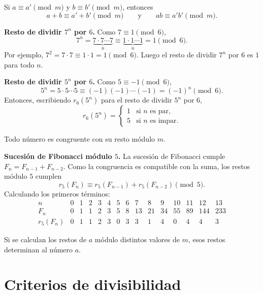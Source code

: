 \begin{proposicion}[{title={Lema: compatibilidad con las operaciones}}]
Si $a\equiv a' \pmod m$ y $b\equiv b' \pmod m$, entonces
\[
a+b \equiv a'+b' \pmod m \qquad \text{y} \qquad ab\equiv a'b' \pmod m.
\]
\end{proposicion}

\begin{ejemplo}
\textbf{Resto de dividir $7^n$ por $6$.} Como $7\equiv 1 \pmod 6$,
\[
7^n = \underbrace{7\cdot 7\cdots 7}_{n} \equiv
\underbrace{1\cdot 1\cdots 1}_{n} = 1 \pmod 6.
\]
Por ejemplo, $7^2=7\cdot 7\equiv 1\cdot 1 = 1 \pmod 6$. Luego el resto
de dividir $7^n$ por $6$ es $1$ para todo $n$.

\textbf{Resto de dividir $5^n$ por $6$.} Como $5\equiv -1 \pmod 6$,
\[
5^n = 5\cdot 5\cdots 5 \equiv (-1)(-1)\cdots(-1) = (-1)^n \pmod 6.
\]
Entonces, escribiendo $r_6(5^n)$ para el resto de dividir $5^n$ por $6$,
\[
r_6(5^n) =
\begin{cases}
1 & \text{si } n \text{ es par},\\
5 & \text{si } n \text{ es impar}.
\end{cases}
\]
\end{ejemplo}

\begin{nota}
Todo número es congruente con su resto módulo $m$.
\end{nota}

\begin{ejemplo}
\textbf{Sucesión de Fibonacci módulo $5$.} La sucesión de Fibonacci
cumple $F_n=F_{n-1}+F_{n-2}$. Como la congruencia es compatible con la
suma, los restos módulo $5$ cumplen
\[
r_5(F_n) \equiv r_5(F_{n-1}) + r_5(F_{n-2}) \pmod 5.
\]
Calculando los primeros términos:
\[
\begin{array}{c|cccccccccccccc}
n & 0 & 1 & 2 & 3 & 4 & 5 & 6 & 7 & 8 & 9 & 10 & 11 & 12 & 13 \\
\hline
F_n & 0 & 1 & 1 & 2 & 3 & 5 & 8 & 13 & 21 & 34 & 55 & 89 & 144 & 233 \\
r_5(F_n) & 0 & 1 & 1 & 2 & 3 & 0 & 3 & 3 & 1 & 4 & 0 & 4 & 4 & 3
\end{array}
\]
\end{ejemplo}

\begin{nota}
Si se calculan los restos de $a$ módulo distintos valores de $m$, esos
restos determinan al número $a$.
\end{nota}

\section{Criterios de divisibilidad}

